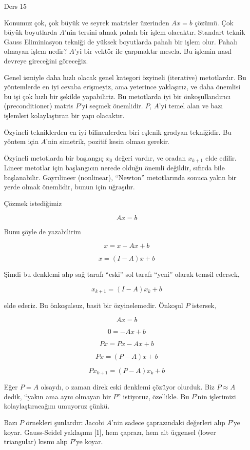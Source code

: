 \documentclass[12pt,fleqn]{article}\usepackage{../../common}
\begin{document}
Ders 15

Konumuz çok, çok büyük ve seyrek matrisler üzerinden $Ax = b$ çözümü. Çok
büyük boyutlarda $A$'nin tersini almak pahalı bir işlem olacaktır. Standart
teknik Gauss Eliminiasyon tekniği de yüksek boyutlarda pahalı bir işlem
olur. Pahalı olmayan işlem nedir? $A$'yi bir vektör ile çarpmaktır
mesela. Bu işlemin nasıl devreye gireceğini göreceğiz.

Genel ismiyle daha hızlı olacak genel kategori özyineli (iterative)
metotlardır. Bu yöntemlerde en iyi cevaba erişmeyiz, ama yeterince
yaklaşırız, ve daha önemlisi bu işi çok hızlı bir şekilde
yapabiliriz. Bu metotlarda iyi bir önkoşullandırıcı (preconditioner)
matris $P$'yi seçmek önemlidir. $P$, $A$'yi temel alan ve bazı işlemleri
kolaylaştıran bir yapı olacaktır. 

Özyineli tekniklerden en iyi bilinenlerden biri eşlenik gradyan
tekniğidir. Bu yöntem için $A$'nin simetrik, pozitif kesin olması gerekir.

Özyineli metotlarda bir başlangıç $x_0$ değeri vardır, ve oradan $x_{k+1}$
elde edilir. Lineer metotlar için başlangıcın nerede olduğu önemli
değildir, sıfırda bile başlanabilir. Gayrılineer (nonlinear), ``Newton''
metotlarında sonuca yakın bir yerde olmak önemlidir, bunun için uğraşılır.

Çözmek istediğimiz 

$$ Ax = b $$

Bunu şöyle de yazabilirim 

$$ x = x - Ax + b $$

$$ x = (I - A)x + b $$

Şimdi bu denklemi alıp sağ tarafı ``eski'' sol tarafı ``yeni'' olarak
temsil edersek,

$$ x_{k+1} = (I - A)x_k + b $$

elde ederiz. Bu önkoşulsuz, basit bir özyinelemedir. Önkoşul $P$ istersek,

$$ Ax = b $$

$$ 0 = -Ax + b $$

$$ Px = Px - Ax + b $$

$$ Px = (P -A)x + b $$

$$ Px_{k+1} =  (P - A)x_k + b $$

Eğer $P = A$ olsaydı, o zaman direk eski denklemi çözüyor olurduk.  
Biz $P\approx A$ dedik, ``yakın ama aynı olmayan bir $P$'' istiyoruz,
özellikle. Bu $P$'nin işlerimizi kolaylaştıracağını umuyoruz çünkü.

Bazı $P$ örnekleri şunlardır: Jacobi $A$'nin sadece çaprazındaki değerleri
alıp $P$'ye koyar. Gauss-Seidel yaklaşımı [1], hem çaprazı, hem alt üçgensel
(lower triangular) kısmı alıp $P$'ye koyar.
\end{document}
